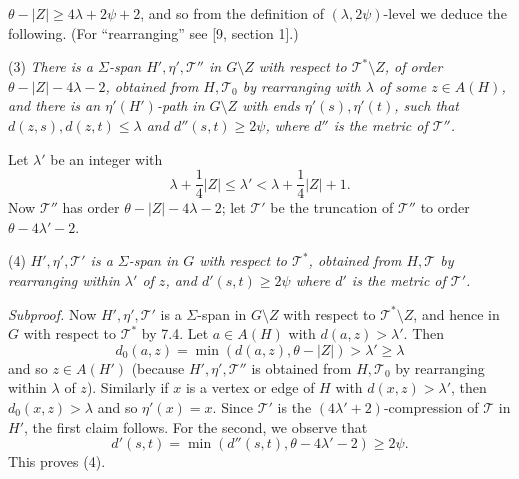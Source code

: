 \noindent $\theta - |Z| \ge 4\lambda + 2\psi + 2$, and so from the definition of $(\lambda, 2\psi)$-level we deduce the following. (For ``rearranging'' see [9, section 1].)

\hspace*{12pt}(3) \textit{There is a $\Sigma$-span $H', \eta', \mathcal{T}''$ in $G \setminus Z$ with respect to $\mathcal{T}^* \setminus Z$, of order $\theta - |Z| - 4\lambda - 2$, obtained from $H, \mathcal{T}_0$ by rearranging with $\lambda$ of some $z \in A(H)$, and there is an $\eta'(H')$-path in $G \setminus Z$ with ends $\eta'(s), \eta'(t)$, such that $d(z, s), d(z, t) \le \lambda$ and $d''(s, t) \ge 2\psi$, where $d''$ is the metric of $\mathcal{T}''$.}

Let $\lambda'$ be an integer with
\begin{equation*}
\lambda + \frac{1}{4}|Z| \le \lambda' < \lambda + \frac{1}{4}|Z| + 1.
\end{equation*}
Now $\mathcal{T}''$ has order $\theta - |Z| - 4\lambda - 2$; let $\mathcal{T}'$ be the truncation of $\mathcal{T}''$ to order $\theta - 4\lambda' - 2$.

\hspace*{12pt}(4) \textit{$H', \eta', \mathcal{T}'$ is a $\Sigma$-span in $G$ with respect to $\mathcal{T}^*$, obtained from $H, \mathcal{T}$ by rearranging within $\lambda'$ of $z$, and $d'(s, t) \ge 2\psi$ where $d'$ is the metric of $\mathcal{T}'$.}

\textit{Subproof.} Now $H', \eta', \mathcal{T}'$ is a $\Sigma$-span in $G \setminus Z$ with respect to $\mathcal{T}^* \setminus Z$, and hence in $G$ with respect to $\mathcal{T}^*$ by 7.4. Let $a \in A(H)$ with $d(a, z) > \lambda'$. Then
\begin{equation*}
d_0(a, z) = \min(d(a, z), \theta - |Z|) > \lambda' \ge \lambda
\end{equation*}
and so $z \in A(H')$ (because $H', \eta', \mathcal{T}''$ is obtained from $H, \mathcal{T}_0$ by rearranging within $\lambda$ of $z$). Similarly if $x$ is a vertex or edge of $H$ with $d(x, z) > \lambda'$, then $d_0(x, z) > \lambda$ and so $\eta'(x) = x$. Since $\mathcal{T}'$ is the $(4\lambda' + 2)$-compression of $\mathcal{T}$ in $H'$, the first claim follows. For the second, we observe that
\begin{equation*}
d'(s, t) = \min(d''(s, t), \theta - 4\lambda' - 2) \ge 2\psi.
\end{equation*}
This proves (4).

